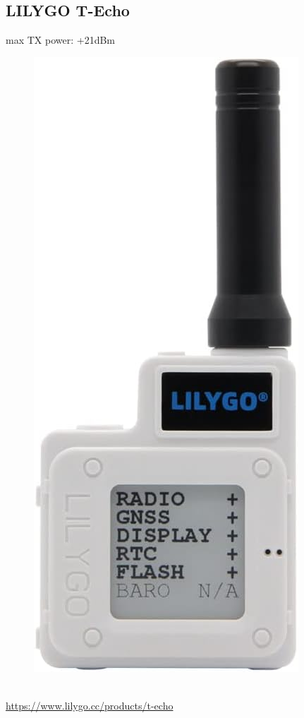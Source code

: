 \documentclass[12pt,a4paper]{article}
\begin{document}
\subsection{LILYGO T-Echo}
max TX power: +21dBm\\
\begin{figure}[h]
	\includegraphics[scale=0.1]{./Bilder/Devices/t-echo.jpg}
\end{figure}\\
\url{https://www.lilygo.cc/products/t-echo}\\
\end{document}
